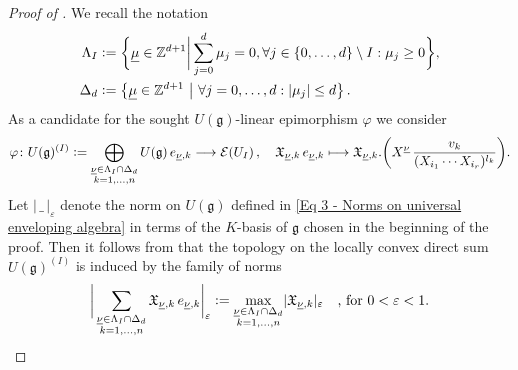 \documentclass[a4paper, reqno, 10pt]{amsart}
\theoremstyle{definition}
\numberwithin{equation}{section}
\newcommand{\abs}[1]{{\lvert{#1}\rvert}}
\newcommand{\blank}{{\,\_\,}}
\newcommand{\defeq}{\vcentcolon=}
\newcommand{\lra}{\longrightarrow}
\newcommand{\lto}{\longmapsto}
\newcommand{\ul}[1]{{\underline{#1}}}
\let\originalmiddle\middle
\renewcommand{\middle}[1]{\,\originalmiddle#1\,}
\newcommand{\BZ}{{\mathbb {Z}}}
\newcommand{\CE}{{\mathcal {E}}}
\newcommand{\Fg}{{\mathfrak {g}}}
\newcommand{\FX}{{\mathfrak {X}}}
\begin{document}
\begin{proof}[{Proof of }]
We recall the notation
\begin{align*}
	\Lambda_I &\defeq \bigg\{ \ul{\mu} \in \BZ^{d+1} \bigg\vert \sum_{j=0}^d \mu_j =0 , \forall j\in \{0,\ldots,d\} \setminus I : \mu_j \geq 0 \bigg\} , \\
	\Delta_d &\defeq \left\{ \ul{\mu} \in \BZ^{d+1} \middle{|} \forall j=0,\ldots,d: \abs{ \mu_j} \leq d \right\} .
\end{align*}
As a candidate for the sought $U(\Fg)$-linear epimorphism $\varphi$ we consider
\begin{align*}
	\varphi \colon U(\Fg)^{(I)} \defeq \bigoplus_{\substack{\ul{\nu} \in \Lambda_I \cap \Delta_d \\ k=1,\ldots,n}} U(\Fg) \, e_{\ul{\nu},k} \lra \CE(U_I) \,,\quad
			\FX_{\ul{\nu},k} \, e_{\ul{\nu},k} \lto \FX_{\ul{\nu},k}. \bigg(X^\ul{\nu} \, \frac{v_k}{(X_{i_1}\cdots X_{i_r})^{l_k}} \bigg) .
\end{align*}
Let $\abs{\blank}_\varepsilon$ denote the norm on $U(\Fg)$ defined in \eqref{Eq 3 - Norms on universal enveloping algebra} in terms of the $K$-basis of $\Fg$ chosen in the beginning of the proof.
Then it follows from  that the topology on the locally convex direct sum $U(\Fg)^{(I)}$ is induced by the family of norms
\begin{equation*}
	\bigg\lvert \sum_{\substack{\ul{\nu} \in \Lambda_I \cap \Delta_d \\ k=1,\ldots,n}} \FX_{\ul{\nu},k} \, e_{\ul{\nu},k} \bigg\rvert_\varepsilon
		\defeq \max_{\substack{\ul{\nu} \in \Lambda_I \cap \Delta_d \\ k=1,\ldots,n}} \lvert \FX_{\ul{\nu},k} \rvert_\varepsilon 
		\quad \text{, for $0<\varepsilon < 1$.}
\end{equation*}



\end{proof}
\end{document}
